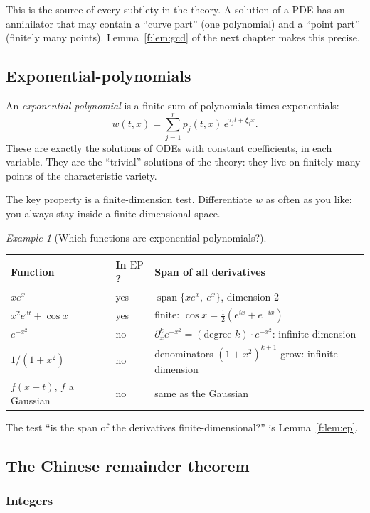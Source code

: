 \documentclass[11pt]{article}
\theoremstyle{plain}
\theoremstyle{definition}
\theoremstyle{remark}
\newtheorem{example}[theorem]{Example}
\DeclareMathOperator{\spn}{span}
\newcommand{\EP}{\mathrm{EP}}               %
\begin{document}
This is the source of every subtlety in the theory. A solution of a PDE has an annihilator that may contain a ``curve part'' (one polynomial) and a ``point part'' (finitely many points). Lemma~\ref{f:lem:gcd} of the next chapter makes this precise.

\subsection{Exponential-polynomials}\label{sec:pr-ep}

An \emph{exponential-polynomial} is a finite sum of polynomials times exponentials:
\[
w(t,x)=\sum_{j=1}^{r}p_j(t,x)\,e^{\tau_jt+\xi_jx}.
\]
These are exactly the solutions of ODEs with constant coefficients, in each variable. They are the ``trivial'' solutions of the theory: they live on finitely many points of the characteristic variety.

The key property is a finite-dimension test. Differentiate $w$ as often as you like: you always stay inside a finite-dimensional space.

\begin{example}[{Which functions are exponential-polynomials?}]
\begin{center}\small
\begin{tabular}{@{}L{4.4cm}L{1.6cm}L{8.0cm}@{}}
\toprule
Function & In $\EP$? & Span of all derivatives\\\midrule
$xe^{x}$ & yes & $\spn\{xe^x,\ e^x\}$, dimension $2$\\
$x^2e^{3t}+\cos x$ & yes & finite: $\cos x=\tfrac12(e^{ix}+e^{-ix})$\\
$e^{-x^2}$ & no & $\partial_x^ke^{-x^2}=(\text{degree }k)\cdot e^{-x^2}$: infinite dimension\\
$1/(1+x^2)$ & no & denominators $(1+x^2)^{k+1}$ grow: infinite dimension\\
$f(x+t)$, $f$ a Gaussian & no & same as the Gaussian\\
\bottomrule
\end{tabular}
\end{center}
The test ``is the span of the derivatives finite-dimensional?'' is Lemma~\ref{f:lem:ep}.
\end{example}

\subsection{The Chinese remainder theorem}\label{sec:pr-crt}

\subsubsection{Integers}
\end{document}
